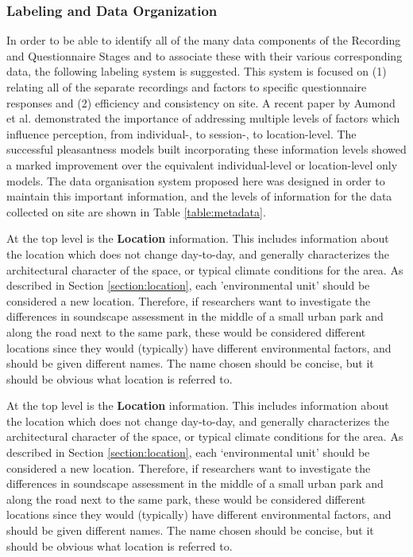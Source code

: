    \subsubsection{Labeling and Data Organization}
     \label{section:metadata}
     In order to be able to identify all of the many data components of the Recording and Questionnaire Stages and to associate these with their various corresponding data, the following labeling system is suggested. This system is focused on (1) relating all of the separate recordings and factors to specific questionnaire responses and (2) efficiency and consistency on site. A recent paper by Aumond et al. \citep{Aumond2017Modeling} demonstrated the importance of addressing multiple levels of factors which influence perception, from individual-, to session-, to location-level. The successful pleasantness models built incorporating these information levels showed a marked improvement over the equivalent individual-level or location-level only models. The data organisation system proposed here was designed in order to maintain this important information, and the levels of information for the data collected on site are shown in Table \ref{table:metadata}.

     At the top level is the \textbf{Location} information. This includes information about the location which does not change day-to-day, and generally characterizes the architectural character of the space, or typical climate conditions for the area. As described in Section \ref{section:location}, each 'environmental unit' should be considered a new location. Therefore, if researchers want to investigate the differences in soundscape assessment in the middle of a small urban park and along the road next to the same park, these would be considered different locations since they would (typically) have different environmental factors, and should be given different names. The name chosen should be concise, but it should be obvious what location is referred to.

     At the top level is the \textbf{Location} information. This includes information about the location which does not change day-to-day, and generally characterizes the architectural character of the space, or typical climate conditions for the area. As described in Section \ref{section:location}, each `environmental unit' should be considered a new location. Therefore, if researchers want to investigate the differences in soundscape assessment in the middle of a small urban park and along the road next to the same park, these would be considered different locations since they would (typically) have different environmental factors, and should be given different names. The name chosen should be concise, but it should be obvious what location is referred to.

